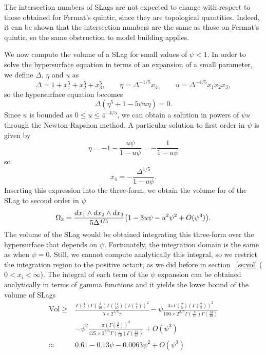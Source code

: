 The intersection numbers of SLags are not expected to change with respect to those obtained for Fermat's
quintic, since they are topological quantities.
Indeed, it can be shown that the intersection numbers are the same as those on Fermat's quintic, so
the same obstruction to model building applies.

We now compute the volume of a SLag for small values of $\psi<1$.
In order to solve the hypersurface equation in terms of an expansion of a small parameter, 
we define $\Delta$, $\eta$ and $u$ \cite{Candelas1991} as
\begin{equation}
\Delta = 1 + x_1^5 + x_2^5 +x_3^5, \qquad \eta = \Delta^{-1/5} x_4, \qquad u = \Delta^{-4/5} x_1 x_2 x_3,
\end{equation}
so the hypersurface equation becomes
\begin{equation}
  \Delta (\eta^5+1-5\psi u\eta)=0.
\end{equation}
Since $u$ is bounded as $0\leq u \leq 4^{-4/5}$, we can obtain a solution in powers of
$\psi u$ through the Newton-Rapshon method.
A particular solution to first order in $\psi$ is given by
\begin{equation}
  \eta=-1-\frac{u\psi}{1-u\psi}=-\frac{1}{1-u\psi}
\end{equation}
so 
\begin{equation}
  x_4=-\frac{\Delta^{1/5}}{1-u\psi}.
\end{equation}
Inserting this expression into the three-form, we obtain the volume for of
the SLag to second order in $\psi$ 
\begin{equation}
  \Omega_3=\frac{dx_1\wedge dx_2\wedge dx_3}{5\Delta^{4/5}}\qty(1-3u\psi-u^2\psi^2+O(\psi^3)).
\end{equation}
The volume of the SLag would be obtained integrating this three-form over the hypersurface that depends on $\psi$.
Fortunately, the integration domain is the same as when $\psi=0$.
Still, we cannot compute analytically this integral, so we restrict the integration region to
the positive octant, as we did before in section ~\ref{ss:vol} ($0<x_i<\infty$).
The integral of each term of the $\psi$ expansion can be obtained analytically in terms of gamma functions
and it yields the lower bound of the volume of SLags
\begin{align}
  \mathrm{Vol}\geq&
\frac{\Gamma\left(\frac{1}{5} \right) \Gamma\left(\frac{3}{10}\right)  \Gamma\left(\frac{11}{10}\right)  (\Gamma\left(\frac{6}{5} \right))^2}{5 \times 2^{1/5} \pi} 
  -  \psi  \frac{3 \pi \Gamma\left( \frac{2}{5}\right) (\Gamma\left( \frac{7}{5}\right))^2}{100 \times 2^{2/5} \Gamma\left( \frac{9}{10} \right) \Gamma(\frac{13}{10})} \\
  &-  \psi^2 \frac{\pi (\Gamma\left( \frac{3}{5}\right))^3}{125 \times 2^{3/5} \Gamma\left( \frac{1}{10} \right) \Gamma\left( \frac{17}{10} \right)} + O(\psi^3)\\
 \approx& 0.61-0.13\psi-0.0063\psi^2+O(\psi^3)
\end{align}
